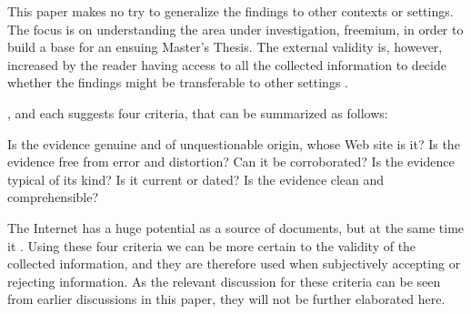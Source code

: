 This paper makes no try to generalize the findings to other contexts or settings. The focus is on understanding the area under investigation, freemium, in order to build a base for an ensuing Master's Thesis. The external validity is, however, increased by the reader having access to all the collected information to decide whether the findings might be transferable to other settings \citep{payne2005}.

, \citet{scott1990} and \citet{berg2007} each suggests four criteria, that can be summarized as follows:

\begin{enum}
   Is the evidence genuine and of unquestionable origin, \eg whose Web site is it?
   Is the evidence free from error and distortion? Can it be corroborated?
   Is the evidence typical of its kind? Is it current or dated?
   Is the evidence clean and comprehensible?
\end{enum}

The Internet has a huge potential as a source of documents, but at the same time it  \citep{bryman2008}. Using these four criteria we can be more certain to the validity of the collected information, and they are therefore used when subjectively accepting or rejecting information. As the relevant discussion for these criteria can be seen from earlier discussions in this paper, they will not be further elaborated here.

% 
% 
% 
%
